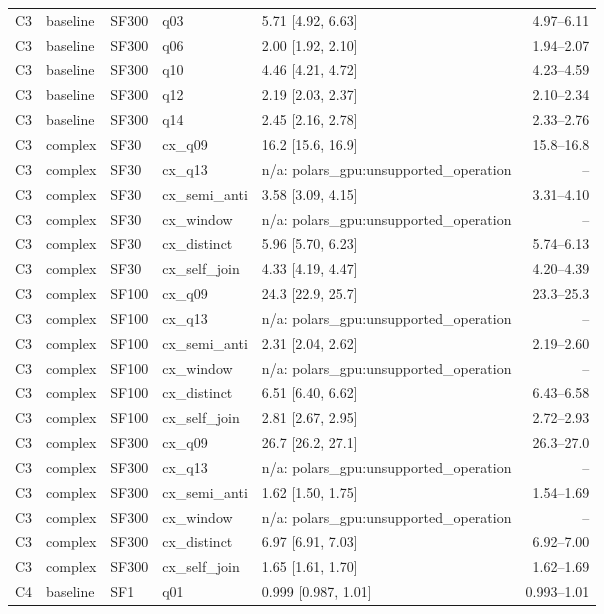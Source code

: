 \begin{longtable}{lllllr}
C3 & baseline & SF300 & q03 & 5.71 [4.92, 6.63] & 4.97--6.11 \\
C3 & baseline & SF300 & q06 & 2.00 [1.92, 2.10] & 1.94--2.07 \\
C3 & baseline & SF300 & q10 & 4.46 [4.21, 4.72] & 4.23--4.59 \\
C3 & baseline & SF300 & q12 & 2.19 [2.03, 2.37] & 2.10--2.34 \\
C3 & baseline & SF300 & q14 & 2.45 [2.16, 2.78] & 2.33--2.76 \\
C3 & complex & SF30 & cx\_q09 & 16.2 [15.6, 16.9] & 15.8--16.8 \\
C3 & complex & SF30 & cx\_q13 & n/a: polars\_gpu:unsupported\_operation & -- \\
C3 & complex & SF30 & cx\_semi\_anti & 3.58 [3.09, 4.15] & 3.31--4.10 \\
C3 & complex & SF30 & cx\_window & n/a: polars\_gpu:unsupported\_operation & -- \\
C3 & complex & SF30 & cx\_distinct & 5.96 [5.70, 6.23] & 5.74--6.13 \\
C3 & complex & SF30 & cx\_self\_join & 4.33 [4.19, 4.47] & 4.20--4.39 \\
C3 & complex & SF100 & cx\_q09 & 24.3 [22.9, 25.7] & 23.3--25.3 \\
C3 & complex & SF100 & cx\_q13 & n/a: polars\_gpu:unsupported\_operation & -- \\
C3 & complex & SF100 & cx\_semi\_anti & 2.31 [2.04, 2.62] & 2.19--2.60 \\
C3 & complex & SF100 & cx\_window & n/a: polars\_gpu:unsupported\_operation & -- \\
C3 & complex & SF100 & cx\_distinct & 6.51 [6.40, 6.62] & 6.43--6.58 \\
C3 & complex & SF100 & cx\_self\_join & 2.81 [2.67, 2.95] & 2.72--2.93 \\
C3 & complex & SF300 & cx\_q09 & 26.7 [26.2, 27.1] & 26.3--27.0 \\
C3 & complex & SF300 & cx\_q13 & n/a: polars\_gpu:unsupported\_operation & -- \\
C3 & complex & SF300 & cx\_semi\_anti & 1.62 [1.50, 1.75] & 1.54--1.69 \\
C3 & complex & SF300 & cx\_window & n/a: polars\_gpu:unsupported\_operation & -- \\
C3 & complex & SF300 & cx\_distinct & 6.97 [6.91, 7.03] & 6.92--7.00 \\
C3 & complex & SF300 & cx\_self\_join & 1.65 [1.61, 1.70] & 1.62--1.69 \\
C4 & baseline & SF1 & q01 & 0.999 [0.987, 1.01] & 0.993--1.01 \\

\end{longtable}
